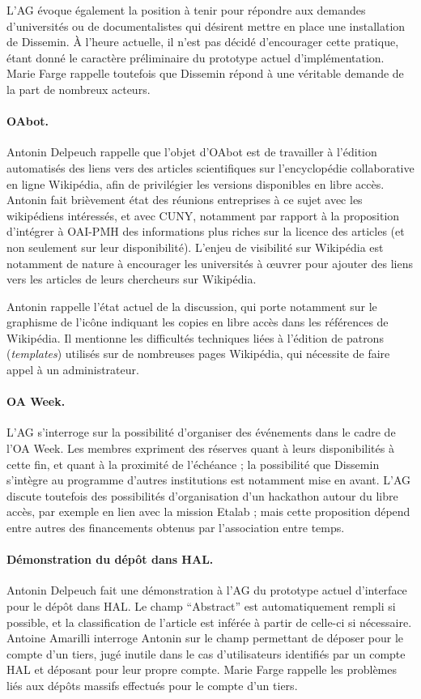 \documentclass{scrartcl}
\begin{document}
L'AG évoque également la position à tenir pour répondre aux demandes
d'universités ou de documentalistes qui désirent mettre en place une
installation de Dissemin. À l'heure actuelle, il n'est pas décidé d'encourager
cette pratique, étant donné le caractère préliminaire du prototype actuel
d'implémentation. Marie Farge rappelle toutefois que Dissemin répond à une
véritable demande de la part de nombreux acteurs.

\paragraph{OAbot.}
Antonin Delpeuch rappelle que l'objet d'OAbot est de travailler à l'édition
automatisés des liens vers des articles scientifiques sur l'encyclopédie
collaborative en ligne Wikipédia, afin de privilégier les versions disponibles
en libre accès. Antonin fait brièvement état des réunions entreprises à ce sujet
avec les wikipédiens intéressés, et avec CUNY, notamment par rapport à la
proposition d'intégrer à OAI-PMH des informations plus riches sur la licence des
articles (et non seulement sur leur disponibilité). L'enjeu de visibilité sur
Wikipédia est notamment de nature à encourager les universités à œuvrer pour
ajouter des liens vers les articles de leurs chercheurs sur Wikipédia.

Antonin rappelle l'état actuel de la discussion, qui porte notamment sur le
graphisme de l'icône indiquant les copies en libre accès dans les références de
Wikipédia. Il mentionne les difficultés techniques liées à l'édition de patrons
(\emph{templates}) utilisés sur de nombreuses pages Wikipédia, qui nécessite de
faire appel à un administrateur.

\paragraph{OA Week.}
L'AG s'interroge sur la possibilité d'organiser des événements dans le cadre de
l'OA Week. Les membres expriment des réserves quant à leurs disponibilités à
cette fin, et quant à la proximité de l'échéance ; la possibilité que Dissemin
s'intègre au programme d'autres institutions est notamment mise en avant.
L'AG discute toutefois des possibilités d'organisation d'un hackathon autour du
libre accès, par exemple en lien avec la mission Etalab ; mais cette proposition
dépend entre autres des financements obtenus par l'association entre temps.

\paragraph{Démonstration du dépôt dans HAL.}
Antonin Delpeuch fait une démonstration à l'AG du prototype actuel d'interface
pour le dépôt dans HAL. Le champ ``Abstract'' est automatiquement rempli si
possible, et la classification de l'article est inférée à partir de celle-ci si
nécessaire. Antoine Amarilli interroge Antonin sur le champ permettant de
déposer pour le compte d'un tiers, jugé inutile dans le cas d'utilisateurs
identifiés par un compte HAL et déposant pour leur propre compte. Marie Farge
rappelle les problèmes liés aux dépôts massifs effectués pour le compte d'un
tiers.
\end{document}
